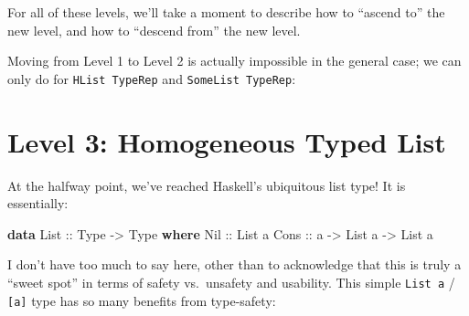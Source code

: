 \documentclass[]{article}
\newenvironment{Shaded}{}{}
\newcommand{\CommentTok}[1]{\textcolor[rgb]{0.38,0.63,0.69}{\textit{#1}}}
\newcommand{\DataTypeTok}[1]{\textcolor[rgb]{0.56,0.13,0.00}{#1}}
\newcommand{\KeywordTok}[1]{\textcolor[rgb]{0.00,0.44,0.13}{\textbf{#1}}}
\newcommand{\NormalTok}[1]{#1}
\newcommand{\OperatorTok}[1]{\textcolor[rgb]{0.40,0.40,0.40}{#1}}
\newcommand{\OtherTok}[1]{\textcolor[rgb]{0.00,0.44,0.13}{#1}}
\begin{document}
For all of these levels, we'll take a moment to describe how to ``ascend to''
the new level, and how to ``descend from'' the new level.

Moving from Level 1 to Level 2 is actually impossible in the general case; we
can only do for \texttt{HList\ TypeRep} and \texttt{SomeList\ TypeRep}:

\begin{Shaded}
\end{Shaded}

\section{Level 3: Homogeneous Typed List}\label{level-3-homogeneous-typed-list}

At the halfway point, we've reached Haskell's ubiquitous list type! It is
essentially:

\begin{Shaded}
\begin{Highlighting}[]
\KeywordTok{data} \DataTypeTok{List}\OtherTok{ ::} \DataTypeTok{Type} \OtherTok{{-}\textgreater{}} \DataTypeTok{Type} \KeywordTok{where}
    \DataTypeTok{Nil}\OtherTok{  ::} \DataTypeTok{List}\NormalTok{ a}
    \DataTypeTok{Cons}\OtherTok{ ::}\NormalTok{ a }\OtherTok{{-}\textgreater{}} \DataTypeTok{List}\NormalTok{ a }\OtherTok{{-}\textgreater{}} \DataTypeTok{List}\NormalTok{ a}
\end{Highlighting}
\end{Shaded}

I don't have too much to say here, other than to acknowledge that this is truly
a ``sweet spot'' in terms of safety vs.~unsafety and usability. This simple
\texttt{List\ a} / \texttt{{[}a{]}} type has so many benefits from type-safety:
\end{document}

